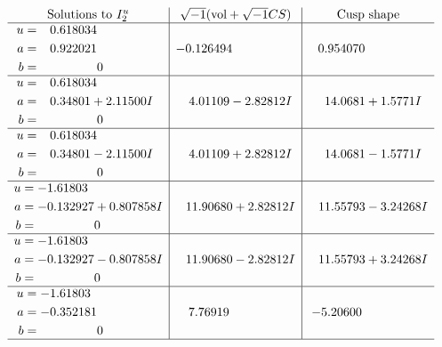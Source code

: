 \documentclass[1p]{elsarticle_modified}
\theoremstyle{definition}
\newcommand{\I}{\sqrt{-1}}
\begin{document}
$$\begin{array}{c|c|c}  
\text{Solutions to }I^u_{2}& \I (\text{vol} + \sqrt{-1}CS) & \text{Cusp shape}\\
 \hline 
\begin{aligned}
u &= \phantom{-}0.618034\phantom{ +0.000000I} \\
a &= \phantom{-}0.922021\phantom{ +0.000000I} \\
b &= \phantom{-0.000000 } 0\end{aligned}
 & -0.126494\phantom{ +0.000000I} & \phantom{-}0.954070\phantom{ +0.000000I} \\ \hline\begin{aligned}
u &= \phantom{-}0.618034\phantom{ +0.000000I} \\
a &= \phantom{-}0.34801 + 2.11500 I \\
b &= \phantom{-0.000000 } 0\end{aligned}
 & \phantom{-}4.01109 - 2.82812 I & \phantom{-}14.0681 + 1.5771 I \\ \hline\begin{aligned}
u &= \phantom{-}0.618034\phantom{ +0.000000I} \\
a &= \phantom{-}0.34801 - 2.11500 I \\
b &= \phantom{-0.000000 } 0\end{aligned}
 & \phantom{-}4.01109 + 2.82812 I & \phantom{-}14.0681 - 1.5771 I \\ \hline\begin{aligned}
u &= -1.61803\phantom{ +0.000000I} \\
a &= -0.132927 + 0.807858 I \\
b &= \phantom{-0.000000 } 0\end{aligned}
 & \phantom{-}11.90680 + 2.82812 I & \phantom{-}11.55793 - 3.24268 I \\ \hline\begin{aligned}
u &= -1.61803\phantom{ +0.000000I} \\
a &= -0.132927 - 0.807858 I \\
b &= \phantom{-0.000000 } 0\end{aligned}
 & \phantom{-}11.90680 - 2.82812 I & \phantom{-}11.55793 + 3.24268 I \\ \hline\begin{aligned}
u &= -1.61803\phantom{ +0.000000I} \\
a &= -0.352181\phantom{ +0.000000I} \\
b &= \phantom{-0.000000 } 0\end{aligned}
 & \phantom{-}7.76919\phantom{ +0.000000I} & -5.20600\phantom{ +0.000000I}\\
 \hline 
 \end{array}$$\newpage\newpage\renewcommand{\arraystretch}{1}
\end{document}
